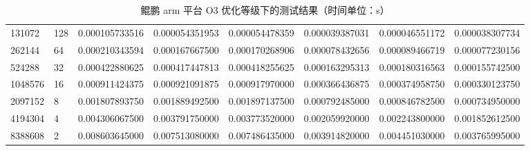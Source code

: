 \documentclass[a4paper]{article}
\begin{document}
\begin{table}[]
{\begin{tabular}{llllllll}
      131072  & 128     & 0.000105733516 & 0.000054351953  & 0.000054478359 & 0.000039387031 & 0.000046551172 & 0.000038307734 \\
      262144  & 64      & 0.000210343594 & 0.000167667500  & 0.000170268906 & 0.000078432656 & 0.000089466719 & 0.000077230156 \\
      524288  & 32      & 0.000422880625 & 0.000417447813  & 0.000418255625 & 0.000163295313 & 0.000180316563 & 0.000155742500 \\
      1048576 & 16      & 0.000911424375 & 0.000921091875  & 0.000917970000 & 0.000366436875 & 0.000374958750 & 0.000330123750 \\
      2097152 & 8       & 0.001807893750 & 0.001889492500  & 0.001897137500 & 0.000792485000 & 0.000846782500 & 0.000734950000 \\
      4194304 & 4       & 0.004306067500 & 0.003791750000  & 0.003773520000 & 0.002059920000 & 0.002243800000 & 0.001852612500 \\
      8388608 & 2       & 0.008603645000 & 0.007513080000  & 0.007486435000 & 0.003914820000 & 0.004451030000 & 0.003765995000
    \end{tabular}%
  }
  \caption{鲲鹏 arm 平台 O3 优化等级下的测试结果（时间单位：s）}
  \label{tab:arm-O3-test}
\end{table}
\end{document}
